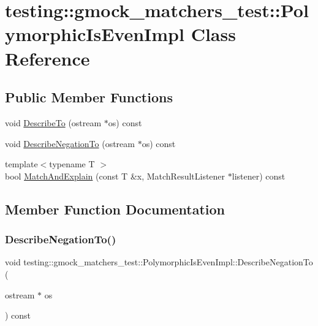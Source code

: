 \hypertarget{classtesting_1_1gmock__matchers__test_1_1PolymorphicIsEvenImpl}{}\section{testing\+::gmock\+\_\+matchers\+\_\+test\+::Polymorphic\+Is\+Even\+Impl Class Reference}
\label{classtesting_1_1gmock__matchers__test_1_1PolymorphicIsEvenImpl}
\subsection*{Public Member Functions}
\begin{DoxyCompactItemize}
\item 
void \mbox{\hyperlink{classtesting_1_1gmock__matchers__test_1_1PolymorphicIsEvenImpl_ac07eb9f72db98b4b5489a139e844394c}{Describe\+To}} (ostream $\ast$os) const
\item 
void \mbox{\hyperlink{classtesting_1_1gmock__matchers__test_1_1PolymorphicIsEvenImpl_a2e873630451f3cf6cad5bf6f82e00a33}{Describe\+Negation\+To}} (ostream $\ast$os) const
\item 
{\footnotesize template$<$typename T $>$ }\\bool \mbox{\hyperlink{classtesting_1_1gmock__matchers__test_1_1PolymorphicIsEvenImpl_ab8d500c4d6c57645527fc367acf6189e}{Match\+And\+Explain}} (const T \&x, Match\+Result\+Listener $\ast$listener) const
\end{DoxyCompactItemize}


\subsection{Member Function Documentation}
\mbox{\label{classtesting_1_1gmock__matchers__test_1_1PolymorphicIsEvenImpl_a2e873630451f3cf6cad5bf6f82e00a33}} 
\subsubsection{\texorpdfstring{DescribeNegationTo()}{DescribeNegationTo()}}
{\footnotesize\ttfamily void testing\+::gmock\+\_\+matchers\+\_\+test\+::\+Polymorphic\+Is\+Even\+Impl\+::\+Describe\+Negation\+To (\begin{DoxyParamCaption}\item[{ostream $\ast$}]{os }\end{DoxyParamCaption}) const\hspace{0.3cm}{\ttfamily [inline]}}

